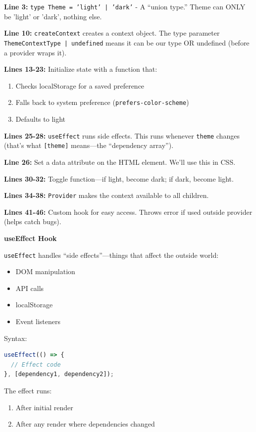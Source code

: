 \documentclass[12pt,a4paper]{article}
\begin{document}
\begin{explanation}
\textbf{Line 3:} \texttt{type Theme = 'light' | 'dark'} - A ``union type.'' Theme can ONLY be 'light' or 'dark', nothing else.

\textbf{Line 10:} \texttt{createContext} creates a context object. The type parameter \texttt{ThemeContextType | undefined} means it can be our type OR undefined (before a provider wraps it).

\textbf{Lines 13-23:} Initialize state with a function that:
\begin{enumerate}
    \item Checks localStorage for a saved preference
    \item Falls back to system preference (\texttt{prefers-color-scheme})
    \item Defaults to light
\end{enumerate}

\textbf{Lines 25-28:} \texttt{useEffect} runs side effects. This runs whenever \texttt{theme} changes (that's what \texttt{[theme]} means---the ``dependency array'').

\textbf{Line 26:} Set a data attribute on the HTML element. We'll use this in CSS.

\textbf{Lines 30-32:} Toggle function---if light, become dark; if dark, become light.

\textbf{Lines 34-38:} \texttt{Provider} makes the context available to all children.

\textbf{Lines 41-46:} Custom hook for easy access. Throws error if used outside provider (helps catch bugs).
\end{explanation}

\begin{concept}
\textbf{useEffect Hook}

\texttt{useEffect} handles ``side effects''---things that affect the outside world:
\begin{itemize}
    \item DOM manipulation
    \item API calls
    \item localStorage
    \item Event listeners
\end{itemize}

Syntax:
\begin{lstlisting}[language=JavaScript]
useEffect(() => {
  // Effect code
}, [dependency1, dependency2]);
\end{lstlisting}

The effect runs:
\begin{enumerate}
    \item After initial render
    \item After any render where dependencies changed
\end{enumerate}
\end{concept}
\end{document}
